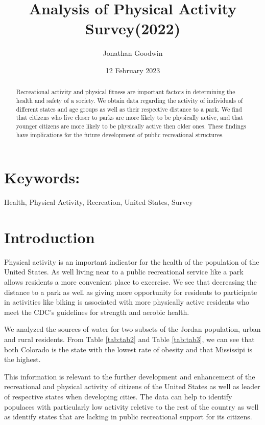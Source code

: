 \documentclass[
]{article}
\title{Analysis of Physical Activity Survey(2022)}
\author{Jonathan Goodwin}
\date{12 February 2023}
\begin{document}
\maketitle
\begin{abstract}
Recreational activity and physical fitness are important factors in determining the health and safety of a society. We obtain data regarding the activity of individuals of different states and age groups as well as their respective distance to a park. We find that citizens who live closer to parks are more likely to be physically active, and that younger citizens are more likely to be physically active then older ones. These findings have implications for the future development of public recreational structures.
\end{abstract}

\hypertarget{keywords}{%
\section{Keywords:}\label{keywords}}

Health, Physical Activity, Recreation, United States, Survey

\hypertarget{Intro}{%
\section{Introduction}\label{Intro}}

Physical activity is an important indicator for the health of the population of the United States. As well living near to a public recreational service like a park allows residents a more convenient place to excercise. We see that decreasing the distance to a park as well as giving more opportunity for residents to participate in activities like biking is associated with more physically active residents who meet the CDC's guidelines for strength and aerobic health.

We analyzed the sources of water for two subsets of the Jordan population, urban and rural residents. From Table \ref{tab:tab2} and Table \ref{tab:tab3}, we can see that both Colorado is the state with the lowest rate of obesity and that Mississipi is the highest.

This information is relevant to the further development and enhancement of the recreational and physical activity of citizens of the United States as well as leader of respective states when developing cities. The data can help to identify populaces with particularly low activity reletive to the rest of the country as well as identify states that are lacking in public recreational support for its citizens.
\end{document}
